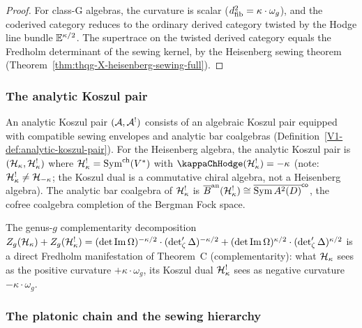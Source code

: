 \begin{proof}
For class-G algebras, the curvature is scalar
($d_{\mathrm{fib}}^2 = \kappa \cdot \omega_g$), and the coderived category
reduces to the ordinary derived category twisted by the Hodge
line bundle $\mathbb{E}^{\kappa/2}$. The supertrace on
the twisted derived category equals the Fredholm determinant
of the sewing kernel, by the Heisenberg sewing theorem
(Theorem~\ref{thm:thqg-X-heisenberg-sewing-full}).
\end{proof}

\subsubsection{The analytic Koszul pair}

\begin{remark}%
%
An analytic Koszul pair $(\mathcal{A}, \mathcal{A}^!)$ consists of an
algebraic Koszul pair equipped with compatible sewing
envelopes and analytic bar coalgebras
(Definition~\ref{V1-def:analytic-koszul-pair}). For the
Heisenberg algebra, the analytic Koszul pair is
$(\mathcal{H}_\kappa, \mathcal{H}_\kappa^!)$ where
$\mathcal{H}_\kappa^! = \operatorname{Sym}^{\mathrm{ch}}(V^*)$ with
$\kappaChHodge(\cH_\kappa^!) = -\kappa$
(note: $\mathcal{H}_\kappa^! \neq \mathcal{H}_{-\kappa}$; the Koszul dual
is a commutative chiral algebra, not a Heisenberg algebra).
The analytic bar coalgebra of $\mathcal{H}_\kappa^!$
is $\overline{B}^{\mathrm{an}}(\mathcal{H}_\kappa^!) \cong
\overline{\operatorname{Sym} A^2(D)}^{\mathsf{co}}$, the
cofree coalgebra completion of the Bergman Fock space.

The genus-$g$ complementarity decomposition
$Z_g(\mathcal{H}_\kappa) + Z_g(\mathcal{H}_\kappa^!)
= (\det\operatorname{Im}\Omega)^{-\kappa/2}
\cdot (\det\nolimits'_\zeta\Delta)^{-\kappa/2}
+ (\det\operatorname{Im}\Omega)^{\kappa/2}
\cdot (\det\nolimits'_\zeta\Delta)^{\kappa/2}$
is a direct Fredholm manifestation of Theorem~C
(complementarity): what $\mathcal{H}_\kappa$ sees as the positive
curvature $+\kappa \cdot \omega_g$, its Koszul dual $\mathcal{H}_\kappa^!$
sees as negative curvature $-\kappa \cdot \omega_g$.
\end{remark}

\subsubsection{The platonic chain and the sewing hierarchy}

